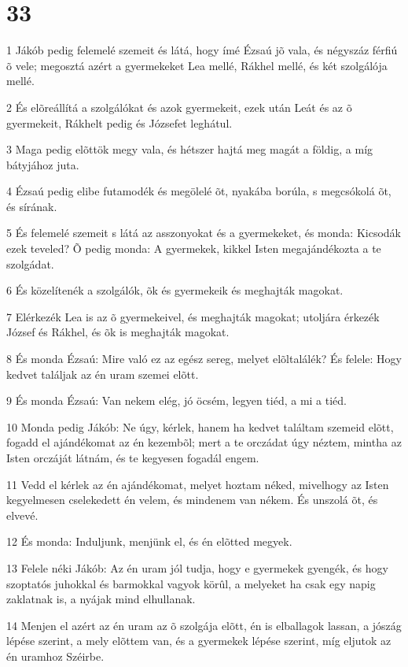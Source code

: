 \chapter{33}

\par 1 Jákób pedig felemelé szemeit és látá, hogy ímé Ézsaú jõ vala, és négyszáz férfiú õ vele; megosztá azért a gyermekeket Lea mellé, Rákhel mellé, és két szolgálója mellé.
\par 2 És elõreállítá a szolgálókat és azok gyermekeit, ezek után Leát és az õ gyermekeit, Rákhelt pedig és Józsefet leghátul.
\par 3 Maga pedig elõttök megy vala, és hétszer hajtá meg magát a földig, a míg bátyjához juta.
\par 4 Ézsaú pedig elibe futamodék és megölelé õt, nyakába borúla, s megcsókolá õt, és sírának.
\par 5 És felemelé szemeit s látá az asszonyokat és a gyermekeket, és monda: Kicsodák ezek teveled? Õ pedig monda: A gyermekek, kikkel Isten megajándékozta a te szolgádat.
\par 6 És közelítenék a szolgálók, õk és gyermekeik és meghajták magokat.
\par 7 Elérkezék Lea is az õ gyermekeivel, és meghajták magokat; utoljára érkezék József és Rákhel, és õk is meghajták magokat.
\par 8 És monda Ézsaú: Mire való ez az egész sereg, melyet elõltalálék? És felele: Hogy kedvet találjak az én uram szemei elõtt.
\par 9 És monda Ézsaú: Van nekem elég, jó öcsém, legyen tiéd, a mi a tiéd.
\par 10 Monda pedig Jákób: Ne úgy, kérlek, hanem ha kedvet találtam szemeid elõtt, fogadd el ajándékomat az én kezembõl; mert a te orczádat úgy néztem, mintha az Isten orczáját látnám, és te kegyesen fogadál engem.
\par 11 Vedd el kérlek az én ajándékomat, melyet hoztam néked, mivelhogy az Isten kegyelmesen cselekedett én velem, és mindenem van nékem. És unszolá õt, és elvevé.
\par 12 És monda: Induljunk, menjünk el, és én elõtted megyek.
\par 13 Felele néki Jákób: Az én uram jól tudja, hogy e gyermekek gyengék, és hogy szoptatós juhokkal és barmokkal vagyok körûl, a melyeket ha csak egy napig zaklatnak is, a nyájak mind elhullanak.
\par 14 Menjen el azért az én uram az õ szolgája elõtt, én is elballagok lassan, a jószág lépése szerint, a mely elõttem van, és a gyermekek lépése szerint, míg eljutok az én uramhoz Széirbe.
